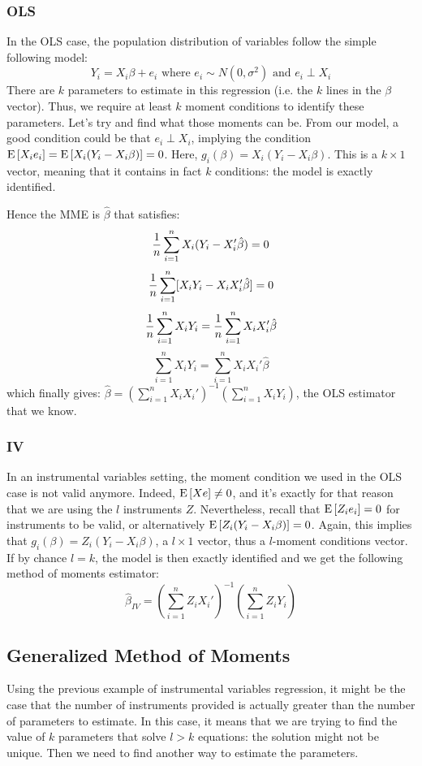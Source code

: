 \subsubsection{OLS}

In the OLS case, the population distribution of variables follow the simple following model: $$Y_i = X_i\beta + e_i \text{ where } e_i \sim N(0,\sigma^2) \text{ and } e_i\perp X_i $$ There are $k$ parameters to estimate in this regression (i.e. the $k$ lines in the $\beta$ vector). Thus, we require at least $k$ moment conditions to identify these parameters. Let's try and find what those moments can be. From our model, a good condition could be that $e_i\perp X_i$, implying the condition $\operatorname{E}\left[X_ie_i\right] = \operatorname{E}\left[X_i(Y_i - X_i\beta)\right] = 0$. Here, $g_{i}(\beta) = X_i(Y_i - X_i\beta)$. This is a $k\times 1$ vector, meaning that it contains in fact $k$ conditions: the model is exactly identified.

Hence the MME is $\hat\beta$ that satisfies: $$\frac{1}{n} \sum_{i=1}^{n}X_i(Y_i - X_i'\hat\beta) = 0 $$ $$\frac{1}{n} \sum_{i=1}^{n}[X_iY_i - X_iX_i'\hat\beta] = 0 $$ $$\frac{1}{n} \sum_{i=1}^{n}X_iY_i = \frac{1}{n} \sum_{i=1}^{n}X_iX_i'\hat\beta $$ $$\sum_{i=1}^{n}X_iY_i = \sum_{i=1}^{n}X_iX_i'\hat\beta $$ which finally gives: $\hat\beta = \left(\sum_{i=1}^{n}X_iX_i'\right)^{-1}\left(\sum_{i=1}^{n}X_iY_i\right) $, the OLS estimator that we know.

\subsubsection{IV}

In an instrumental variables setting, the moment condition we used in the OLS case is not valid anymore. Indeed, $\operatorname{E}\left[Xe\right]\neq 0$, and it's exactly for that reason that we are using the $l$ instruments $Z$. Nevertheless, recall that $\operatorname{E}\left[Z_ie_i\right] = 0$ for instruments to be valid, or alternatively $\operatorname{E}\left[Z_i(Y_i - X_i\beta)\right] = 0$. Again, this implies that $g_i(\beta) =  Z_i(Y_i - X_i\beta)$, a $l\times 1$ vector, thus a $l$-moment conditions vector. If by chance $l=k$, the model is then exactly identified and we get the following method of moments estimator: $$\hat\beta_{IV} = \left(\sum_{i=1}^{n}Z_iX_i'\right)^{-1}\left(\sum_{i=1}^{n}Z_iY_i\right) $$

\subsection{Generalized Method of Moments}

Using the previous example of instrumental variables regression, it might be the case that the number of instruments provided is actually greater than the number of parameters to estimate. In this case, it means that we are trying to find the value of $k$ parameters that solve $l>k$ equations: the solution might not be unique. Then we need to find another way to estimate the parameters.

